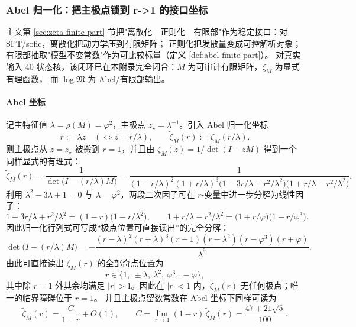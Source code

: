 \subsubsection{Abel 归一化：把主极点锁到 r->1 的接口坐标}\label{app:real-input-40-abel}
主文第 \ref{sec:zeta-finite-part} 节把"离散化—正则化—有限部"作为稳定接口：对 SFT/sofic，离散化把动力学压到有限矩阵；
正则化把发散量变成可控解析对象；有限部抽取"模型不变常数"作为可比较标量（定义 \ref{def:abel-finite-part}）。
对真实输入 40 状态核，该闭环已在本附录完全闭合：$M$ 为可审计有限矩阵，$\zeta_M$ 为显式有理函数，
而 $\log\mathfrak{M}$ 为 Abel/有限部输出。

\paragraph{Abel 坐标}
记主特征值 $\lambda=\rho(M)=\varphi^2$，主极点 $z_\star=\lambda^{-1}$。引入 Abel 归一化坐标
\[
r:=\lambda z\quad(\Leftrightarrow z=r/\lambda),\qquad
\widetilde{\zeta}_M(r):=\zeta_M(r/\lambda).
\]
则主极点从 $z=z_\star$ 被搬到 $r=1$，并且由 $\zeta_M(z)=1/\det(I-zM)$ 得到一个同样显式的有理式：
\[
\widetilde{\zeta}_M(r)
=\frac{1}{\det\!\bigl(I-(r/\lambda)M\bigr)}
=\frac{1}{(1-r/\lambda)^2(1+r/\lambda)^3\bigl(1-3r/\lambda+r^2/\lambda^2\bigr)\bigl(1+r/\lambda-r^2/\lambda^2\bigr)}.
\]
利用 $\lambda^2-3\lambda+1=0$ 与 $\lambda=\varphi^2$，两段二次因子可在 $r$-变量中进一步分解为线性因子：
\[
1-3r/\lambda+r^2/\lambda^2=(1-r)\bigl(1-r/\lambda^2\bigr),\qquad
1+r/\lambda-r^2/\lambda^2=\bigl(1+r/\varphi\bigr)\bigl(1-r/\varphi^3\bigr).
\]
因此归一化行列式可写成“极点位置可直接读出”的完全分解：
\[
\det\!\bigl(I-(r/\lambda)M\bigr)
=-\frac{(r-\lambda)^2(r+\lambda)^3(r-1)(r-\lambda^2)(r-\varphi^3)(r+\varphi)}{\lambda^9}.
\]
由此可直接读出 $\widetilde{\zeta}_M(r)$ 的全部奇点位置为
\[
r\in\{1,\ \pm\lambda,\ \lambda^2,\ \varphi^3,\ -\varphi\},
\]
其中除 $r=1$ 外其余均满足 $|r|>1$。因此在 $|r|<1$ 内，$\widetilde{\zeta}_M(r)$ 无任何极点；唯一的临界障碍位于 $r=1$。
并且主极点留数常数在 Abel 坐标下同样可读为
\[
\widetilde{\zeta}_M(r)=\frac{C}{1-r}+O(1),
\qquad
C=\lim_{r\to 1}(1-r)\,\widetilde{\zeta}_M(r)=\frac{47+21\sqrt5}{100}.
\]
